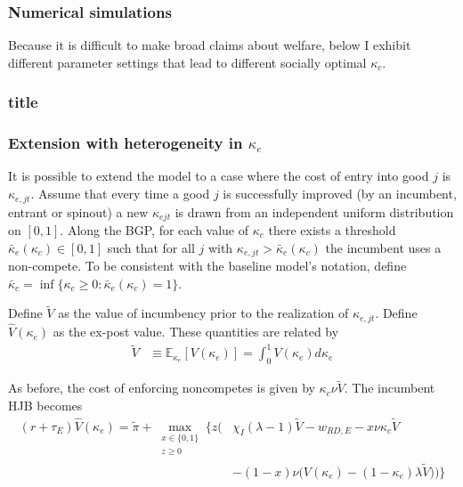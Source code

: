 




\subsubsection{Numerical simulations}

Because it is difficult to make broad claims about welfare, below I exhibit different parameter settings that lead to different socially optimal $\kappa_c$. 

\subsubsection{title}

\subsubsection{Extension with heterogeneity in $\kappa_e$}

It is possible to extend the model to a case where the cost of entry into good $j$ is $\kappa_{e,jt}$. Assume that every time a good $j$ is successfully improved (by an incumbent, entrant or spinout) a new $\kappa_{ejt}$ is drawn from an independent uniform distribution on $[0,1]$. Along the BGP, for each value of $\kappa_c$ there exists a threshold $\bar{\kappa}_{e}(\kappa_c) \in [0,1]$ such that for all $j$ with $\kappa_{e,jt} > \bar{\kappa}_{e} (\kappa_c) $ the incumbent uses a non-compete. To be consistent with the baseline model's notation, define $\bar{\kappa}_c = \inf \{\kappa_c \ge 0: \bar{\kappa}_e(\kappa_c) = 1 \}$.  

Define $\tilde{V}$ as the value of incumbency prior to the realization of $\kappa_{e,jt}$. Define $\hat{V}(\kappa_e)$ as the ex-post value. These quantities are related by 
\begin{align}
	\tilde{V} &\equiv \mathbb{E}_{\kappa_e} [V(\kappa_e)] = \int_0^1 V(\kappa_e) d\kappa_e
\end{align}

As before, the cost of enforcing noncompetes is given by $\kappa_c \nu \tilde{V}$. The incumbent HJB becomes
\begin{align}
	(r + \tau_E) \hat{V}(\kappa_e) = \tilde{\pi} + \max_{\substack{x \in \{0,1\} \\ z \ge 0}} \Bigg\{ z \Big( &\chi_I(\lambda - 1) \tilde{V} - w_{RD,E} - x \nu \kappa_c \tilde{V} \nonumber \\
	&- (1-x) \nu \big( V(\kappa_e) - (1-\kappa_e) \lambda \tilde{V} \big)   \Big)  \Bigg\} \label{ext:hjb_incumbent}
\end{align}

